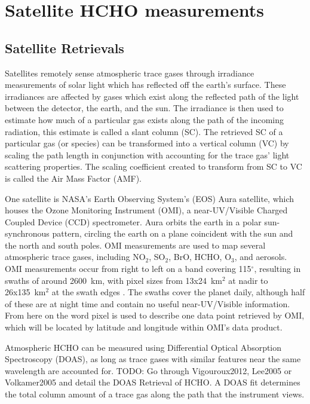\section{Satellite HCHO measurements}
\label{ch_isop:sec:satelliteHCHO}
  \subsection{Satellite Retrievals}
    Satellites remotely sense atmospheric trace gases through irradiance measurements of solar light which has reflected off the earth's surface. 
    These irradiances are affected by gases which exist along the reflected path of the light between the detector, the earth, and the sun. 
    The irradiance is then used to estimate how much of a particular gas exists along the path of the incoming radiation, this estimate is called a slant column (SC).
    The retrieved SC of a particular gas (or species) can be transformed into a vertical column (VC) by scaling the path length in conjunction with accounting for the trace gas' light scattering properties.
    The scaling coefficient created to transform from SC to VC is called the Air Mass Factor (AMF).

    One satellite is NASA's Earth Observing System's (EOS) Aura satellite, which houses the Ozone Monitoring Instrument (OMI), a near-UV/Visible Charged Coupled Device (CCD) spectrometer.
    Aura orbits the earth in a polar sun-synchronous pattern, circling the earth on a plane coincident with the sun and the north and south poles. 
    OMI measurements are used to map several atmospheric trace gases, including NO$_2$, SO$_2$, BrO, HCHO, O$_3$, and aerosols.
    OMI measurements occur from right to left on a band covering 115$^{\circ}$, resulting in swaths of around 2600~km, with pixel sizes from 13x24~km$^2$ at nadir to 26x135~km$^2$ at the swath edges \citep{Gonzalez2015}.
    The swaths cover the planet daily, although half of these are at night time and contain no useful near-UV/Visible information.
    From here on the word pixel is used to describe one data point retrieved by OMI, which will be located by latitude and longitude within OMI's data product.
    
    Atmospheric HCHO can be measured using Differential Optical Absorption Spectroscopy (DOAS), as long as trace gases with similar features near the same wavelength are accounted for.
    TODO: Go through Vigouroux2012, Lee2005 or Volkamer2005 and detail the DOAS Retrieval of HCHO.
    A DOAS fit determines the total column amount of a trace gas along the path that the instrument views.
    
